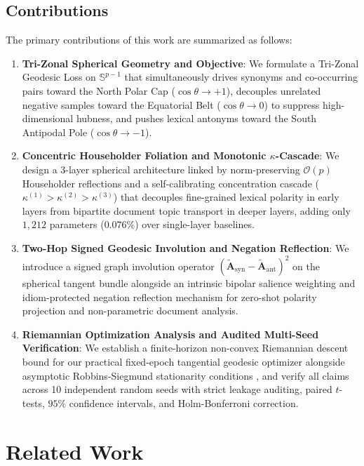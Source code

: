 \documentclass[journal]{IEEEtran}
\begin{document}
\subsection{Contributions}
The primary contributions of this work are summarized as follows:
\begin{enumerate}
    \item \textbf{Tri-Zonal Spherical Geometry and Objective}: We formulate a Tri-Zonal Geodesic Loss on $\mathbb{S}^{p-1}$ that simultaneously drives synonyms and co-occurring pairs toward the North Polar Cap ($\cos\theta \to +1$), decouples unrelated negative samples toward the Equatorial Belt ($\cos\theta \to 0$) to suppress high-dimensional hubness, and pushes lexical antonyms toward the South Antipodal Pole ($\cos\theta \to -1$).
    \item \textbf{Concentric Householder Foliation and Monotonic $\kappa$-Cascade}: We design a 3-layer spherical architecture linked by norm-preserving $\mathcal{O}(p)$ Householder reflections and a self-calibrating concentration cascade ($\kappa^{(1)} > \kappa^{(2)} > \kappa^{(3)}$) that decouples fine-grained lexical polarity in early layers from bipartite document topic transport in deeper layers, adding only $1,212$ parameters ($0.076\%$) over single-layer baselines.
    \item \textbf{Two-Hop Signed Geodesic Involution and Negation Reflection}: We introduce a signed graph involution operator $(\tilde{\mathbf{A}}_{\text{syn}} - \tilde{\mathbf{A}}_{\text{ant}})^2$ on the spherical tangent bundle alongside an intrinsic bipolar salience weighting and idiom-protected negation reflection mechanism for zero-shot polarity projection and non-parametric document analysis.
    \item \textbf{Riemannian Optimization Analysis and Audited Multi-Seed Verification}: We establish a finite-horizon non-convex Riemannian descent bound for our practical fixed-epoch tangential geodesic optimizer alongside asymptotic Robbins-Siegmund stationarity conditions \cite{bonnabel2013stochastic}, and verify all claims across 10 independent random seeds with strict leakage auditing, paired $t$-tests, $95\%$ confidence intervals, and Holm-Bonferroni correction.
\end{enumerate}

\section{Related Work}
\end{document}
